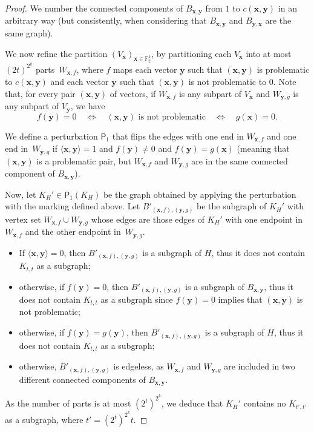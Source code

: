 \documentclass{lmcs}
\theoremstyle{definition}
\begin{document}
\begin{proof}
	We number the connected components of $B_{\mathbf x,\mathbf y}$ from $1$ to $c(\mathbf x,\mathbf y)$ in an arbitrary way (but consistently, when  considering that $B_{\mathbf x,\mathbf y}$ and  $B_{\mathbf y,\mathbf x}$ are the same graph).
	
	We now refine the partition $(V_{\mathbf x})_{\mathbf x\in\mathbb F_2^k}$,
	by partitioning each $V_{\mathbf x}$ into at most $(2t)^{2^k}$ parts~$W_{\mathbf x,f}$, where $f$ maps each vector $\mathbf y$ such that $(\mathbf x,\mathbf y)$ is problematic to $c(\mathbf x,\mathbf y)$ and each vector $\mathbf y$ such that $(\mathbf x,\mathbf y)$ is not problematic to $0$.  
	Note that, for every pair  $(\mathbf x,\mathbf y)$ of vectors, if  
	$W_{\mathbf x,f}$ is any subpart of $V_{\mathbf x}$ and 
	$W_{\mathbf y,g}$ is any subpart of $V_{\mathbf y}$, we have
	\[
	f(\mathbf y)=0\quad\iff\quad(\mathbf x,\mathbf y)\text{ is not problematic}\quad\iff\quad g(\mathbf x)=0.\]
	
	We define a perturbation $\mathsf P_1$ that flips the edges with one end in 
	$W_{\mathbf x,f}$ and one end in~$W_{\mathbf y,g}$ if
	$\langle\mathbf{x},\mathbf{y}\rangle=1$ and
	$f(\mathbf y)\neq 0$ and $f(\mathbf y)=g(\mathbf x)$ (meaning that 	 $(\mathbf x,\mathbf y)$ is a problematic pair, but 	$W_{\mathbf x,f}$ and $W_{\mathbf y,g}$  are in the same connected component of $B_{\mathbf x,\mathbf y}$).
	
	Now, let $K_H'\in\mathsf P_1(K_H)$ be the graph obtained by applying the perturbation with the marking defined above.
	Let $B'_{(\mathbf x,f),(\mathbf y,g)}$ be the subgraph of $K_H'$
	with vertex set  $W_{\mathbf x,f}\cup W_{\mathbf y,g}$ whose edges are those edges of $K_H'$ with one endpoint in  $W_{\mathbf x,f}$ and the other endpoint in~$W_{\mathbf y,g}$.
	\begin{itemize}
		\item If $\langle\mathbf x,\mathbf y\rangle=0$, then $B'_{(\mathbf x,f),(\mathbf y,g)}$ is a subgraph of $H$, thus it does not contain $K_{t,t}$ as a subgraph;
		\item otherwise, if $f(\mathbf y)=0$, then $B'_{(\mathbf x,f),(\mathbf y,g)}$ is a subgraph of $B_{\mathbf x,\mathbf y}$, thus it does not contain $K_{t,t}$ as a subgraph since $f(\mathbf y)=0$ implies that $(\mathbf x,\mathbf y)$ is not problematic;
		\item otherwise, if $f(\mathbf y)=g(\mathbf y)$, then $B'_{(\mathbf x,f),(\mathbf y,g)}$ is a subgraph of $H$, thus it does not contain $K_{t,t}$ as a subgraph;
		\item otherwise,  $B'_{(\mathbf x,f),(\mathbf y,g)}$ is edgeless, as $W_{\mathbf x,f}$ and $W_{\mathbf y,g}$ are included in two different connected components of $B_{\mathbf x,\mathbf y}$.
	\end{itemize}
	As the number of parts is at most $(2^t)^{2^k}$, we deduce that
	$K_H'$ contains no $K_{t',t'}$ as a subgraph, where
	$t'=(2^t)^{2^k}t$.
	

\end{proof}
\end{document}
